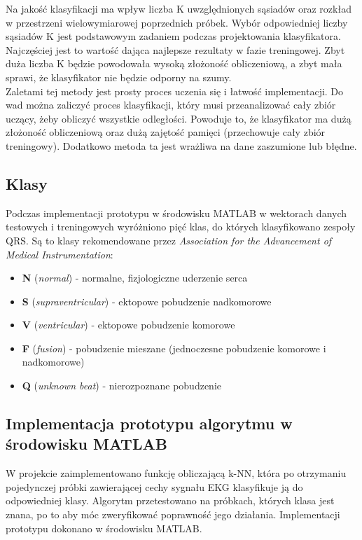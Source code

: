 \documentclass[[10pt,a4paper]{article}
\begin{document}
Na jakość klasyfikacji ma wpływ liczba K uwzględnionych sąsiadów oraz rozkład w przestrzeni wielowymiarowej poprzednich próbek. Wybór odpowiedniej liczby sąsiadów K jest podstawowym zadaniem podczas projektowania klasyfikatora. Najczęściej jest to wartość dająca najlepsze rezultaty w fazie treningowej. Zbyt duża liczba K będzie powodowała wysoką złożoność obliczeniową, a zbyt mała sprawi, że klasyfikator nie będzie odporny na szumy. \\

Zaletami tej metody jest prosty proces uczenia się i łatwość implementacji. Do wad można zaliczyć  proces klasyfikacji, który musi przeanalizować cały zbiór uczący, żeby obliczyć wszystkie odległości. Powoduje to, że klasyfikator ma dużą złożoność obliczeniową oraz dużą zajętość pamięci (przechowuje cały zbiór treningowy). Dodatkowo metoda ta jest wrażliwa na dane zaszumione lub błędne.

\subsection{Klasy}
Podczas implementacji prototypu w środowisku MATLAB w wektorach danych testowych i treningowych wyróżniono pięć klas, do których klasyfikowano zespoły QRS. Są to klasy  rekomendowane przez \emph{Association for the Advancement of Medical Instrumentation}: 
\begin{itemize}
\item \textbf{N} (\emph{normal}) - normalne, fizjologiczne uderzenie serca
\item \textbf{S} (\emph{supraventricular}) - ektopowe pobudzenie nadkomorowe
\item \textbf{V} (\emph{ventricular}) - ektopowe pobudzenie komorowe
\item \textbf{F} (\emph{fusion}) - pobudzenie mieszane (jednoczesne pobudzenie komorowe i nadkomorowe)
\item \textbf{Q} (\emph{unknown beat}) - nierozpoznane pobudzenie
\end{itemize}

\subsection{Implementacja prototypu algorytmu w środowisku MATLAB}
W projekcie zaimplementowano funkcję obliczającą k-NN, która po otrzymaniu pojedynczej próbki zawierającej cechy sygnału EKG klasyfikuje ją do odpowiedniej klasy. Algorytm przetestowano na próbkach, których klasa jest znana, po to aby móc zweryfikować poprawność jego działania. Implementacji prototypu dokonano w środowisku MATLAB. \\
\end{document}
